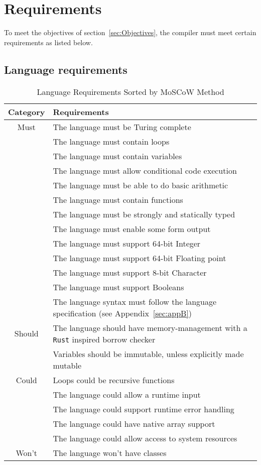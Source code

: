 \newpage
\section{Requirements}
\label{sec:Requirements}

To meet the objectives of section~\ref{sec:Objectives}, the compiler must meet
certain requirements as listed below.

\subsection{Language requirements} 

\begin{table}[ht]
\centering
\begin{tabular}{|c|l|}
\hline
\rowcolor{gray!50}
\textbf{Category} & \textbf{Requirements} \\
\hline \rule{0pt}{10pt}
Must & The language must be Turing complete \\
     & The language must contain loops \\
     & The language must contain variables \\
     & The language must allow conditional code execution \\
     & The language must be able to do basic arithmetic \\
     & The language must contain functions \\
     & The language must be strongly and statically typed \\
     & The language must enable some form output\\
     & The language must support 64-bit Integer \\
     & The language must support 64-bit Floating point \\
     & The language must support 8-bit Character \\
     & The language must support Booleans \\
     & The language syntax must follow the language specification (see
     Appendix~\ref{sec:appB}) \\
\hline \rule{0pt}{10pt}
Should & The language should have memory-management with a \texttt{Rust} inspired borrow checker \\
       & Variables should be immutable, unless explicitly made mutable \\
\hline \rule{0pt}{10pt}
Could & Loops could be recursive functions \\
     & The language could allow a runtime input \\
     & The language could support runtime error handling \\
     & The language could have native array support \\
     & The language could allow access to system resources \\
\hline \rule{0pt}{10pt}
Won't & The language won't have classes \\
\hline
\end{tabular}
\caption{Language Requirements Sorted by MoSCoW Method}
\end{table}

